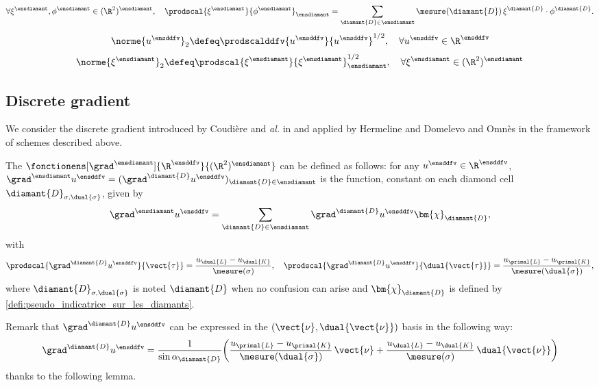 \[
\forall \xi^\ensdiamant, \phi^\ensdiamant \in (\R^2)^\ensdiamant, \quad
\prodscal{\xi^\ensdiamant}{\phi^\ensdiamant}_\ensdiamant = \sum_{\diamant{D} \in \ensdiamant} \mesure(\diamant{D}) \, \xi^{\diamant{D}} \cdot \phi^{\diamant{D}}.
\]
\[
\norme{u^\ensddfv}_2 \defeq \prodscalddfv{u^\ensddfv}{u^\ensddfv}^{1/2}, \quad \forall u^\ensddfv \in \R^\ensddfv
\]
\[
\norme{\xi^\ensdiamant}_2 \defeq \prodscal{\xi^\ensdiamant}{\xi^\ensdiamant}^{1/2}_\ensdiamant, \quad \forall \xi^\ensdiamant \in (\R^2)^\ensdiamant
\]

\subsection{Discrete gradient {\cite{andreianov_discrete_2007,krell_schemas_2010}}}

We consider the discrete gradient introduced by Coudière and \emph{al.} in \cite{coudiere_convergence_1999} and applied by Hermeline \cite{hermeline_finite_2000} and Domelevo and Omnès \cite{domelevo_finite_2005} in the framework of \ddfv schemes described above.

\begin{defi}
    The  $\fonctionens[\grad^\ensdiamant]{\R^\ensddfv}{(\R^2)^\ensdiamant}$ can be defined as follows: 
    for any $u^\ensddfv \in \R^\ensddfv$, $\grad^\ensdiamant u^\ensddfv = (\grad^{\diamant{D}} u^\ensddfv)_{\diamant{D} \in \ensdiamant}$ is the function, constant on each diamond cell $\diamant{D}_{\sigma, \dual{\sigma}}$, given by
    \[
    \grad^\ensdiamant u^\ensddfv = \sum_{\diamant{D} \in \ensdiamant} \grad^{\diamant{D}} u^\ensddfv \bm{\chi}_{\diamant{D}},
    \]
    with
    \[
    \prodscal{\grad^{\diamant{D}} u^\ensddfv}{\vect{\tau}} = \frac{u_{\dual{L}} - u_{\dual{K}}}{\mesure(\sigma)}, \quad
    \prodscal{\grad^{\diamant{D}} u^\ensddfv}{\dual{\vect{\tau}}} = \frac{u_{\primal{L}} - u_{\primal{K}}}{\mesure(\dual{\sigma})},
    \]
    where $\diamant{D}_{\sigma, \dual{\sigma}}$ is noted $\diamant{D}$ when no confusion can arise and $\bm{\chi}_{\diamant{D}}$ is defined by \ref{defi:pseudo_indicatrice_sur_les_diamants}.
\end{defi}
Remark that $\grad^{\diamant{D}} u^\ensddfv$ can be expressed in the $(\vect{\nu}, \dual{\vect{\nu}})$ basis in the following way:
\[
\grad^{\diamant{D}} u^\ensddfv = \frac{1}{\sin \alpha_{\diamant{D}}} \mathopen{}\left( \frac{u_{\primal{L}} - u_{\primal{K}}}{\mesure(\dual{\sigma})} \, \vect{\nu} + \frac{u_{\dual{L}} - u_{\dual{K}}}{\mesure(\sigma)} \, \dual{\vect{\nu}} \right)
\]
thanks to the following lemma.

